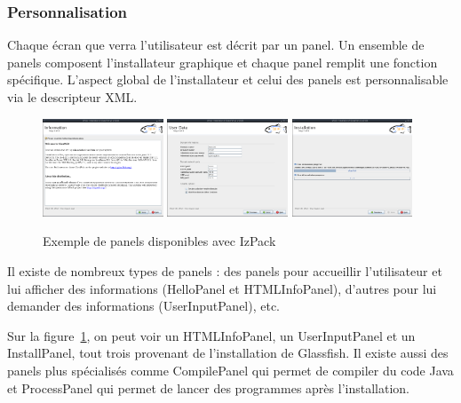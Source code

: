 \subsubsection{Personnalisation}
Chaque écran que verra l'utilisateur est décrit par un panel.
Un ensemble de panels composent l'installateur graphique et chaque panel remplit une fonction spécifique.
L'aspect global de l'installateur et celui des panels est personnalisable via le descripteur XML.
\begin{figure}[H]
	\centering
	\includegraphics[width=0.32\textwidth]{../dia/included/install/02.png}
	\includegraphics[width=0.32\textwidth]{../dia/included/install/05.png}
	\includegraphics[width=0.32\textwidth]{../dia/included/install/06.png}
	\caption{Exemple de panels disponibles avec IzPack}
	\label{fig:panelGlass}
\end{figure}
Il existe de nombreux types de panels : des panels pour accueillir l'utilisateur et lui afficher des informations (HelloPanel et HTMLInfoPanel), d'autres pour lui demander des informations (UserInputPanel), etc.

Sur la figure~\ref{fig:panelGlass}, on peut voir un HTMLInfoPanel, un UserInputPanel et un InstallPanel, tout trois provenant de l'installation de Glassfish.
Il existe aussi des panels plus spécialisés comme CompilePanel qui permet de compiler du code Java et ProcessPanel qui permet de lancer des programmes après l'installation.

